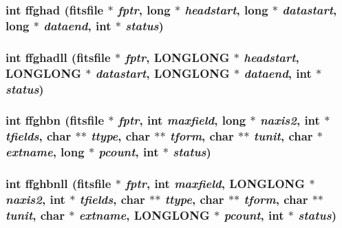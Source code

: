 \subsubsection{\setlength{\rightskip}{0pt plus 5cm}int ffghad (\bf{fitsfile} $\ast$ {\em fptr}, long $\ast$ {\em headstart}, long $\ast$ {\em datastart}, long $\ast$ {\em dataend}, int $\ast$ {\em status})}\label{fitsio__64_8h_e1b924d5db7f75a39e445055e1bb12cc}


\subsubsection{\setlength{\rightskip}{0pt plus 5cm}int ffghadll (\bf{fitsfile} $\ast$ {\em fptr}, \bf{LONGLONG} $\ast$ {\em headstart}, \bf{LONGLONG} $\ast$ {\em datastart}, \bf{LONGLONG} $\ast$ {\em dataend}, int $\ast$ {\em status})}\label{fitsio__64_8h_d9af6a189f3d9ea5cab7da778ed4cdd2}


\subsubsection{\setlength{\rightskip}{0pt plus 5cm}int ffghbn (\bf{fitsfile} $\ast$ {\em fptr}, int {\em maxfield}, long $\ast$ {\em naxis2}, int $\ast$ {\em tfields}, char $\ast$$\ast$ {\em ttype}, char $\ast$$\ast$ {\em tform}, char $\ast$$\ast$ {\em tunit}, char $\ast$ {\em extname}, long $\ast$ {\em pcount}, int $\ast$ {\em status})}\label{fitsio__64_8h_bc0f689fe3484d2f9c8a9703b058b342}


\subsubsection{\setlength{\rightskip}{0pt plus 5cm}int ffghbnll (\bf{fitsfile} $\ast$ {\em fptr}, int {\em maxfield}, \bf{LONGLONG} $\ast$ {\em naxis2}, int $\ast$ {\em tfields}, char $\ast$$\ast$ {\em ttype}, char $\ast$$\ast$ {\em tform}, char $\ast$$\ast$ {\em tunit}, char $\ast$ {\em extname}, \bf{LONGLONG} $\ast$ {\em pcount}, int $\ast$ {\em status})}\label{fitsio__64_8h_63346aca0b8254ae989a8c62e45a532a}


